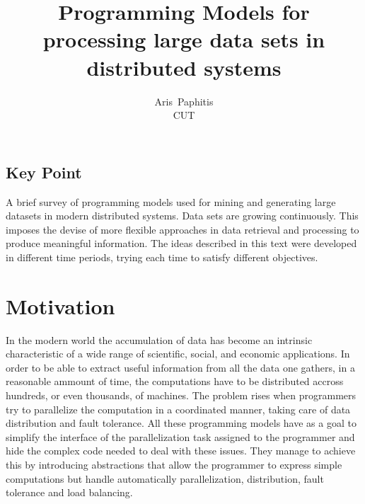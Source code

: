 \documentclass[letterpaper,twocolumn,10pt]{article}
\begin{document}
\date{}

\title{\Large \bf Programming Models for processing large data sets in distributed systems}

\author{
{\rm Aris\ Paphitis}\\
CUT
} %

\maketitle

\thispagestyle{empty}


\subsection*{Key Point}
A brief survey of programming models used for mining and generating large datasets in modern distributed systems. Data sets are growing continuously. This imposes the devise of more flexible approaches in data retrieval and processing to produce meaningful information. The ideas described in this text were developed in different time periods, trying each time to satisfy different objectives.


\section{Motivation}
In the modern world the accumulation of data has become an intrinsic characteristic of a wide range of scientific, social, and economic applications. In order to be able to extract useful information from all the data one gathers, in a reasonable ammount of time, the computations have to be distributed accross hundreds, or even thousands, of machines. The problem rises when programmers try to parallelize the computation in a coordinated manner, taking care of data distribution and fault tolerance. All these programming models have as a goal to simplify the interface of the parallelization task assigned to the programmer and hide the complex code needed to deal with these issues. They manage to achieve this by introducing abstractions that allow the programmer to express simple computations but handle automatically parallelization, distribution, fault tolerance and load balancing.
\end{document}
